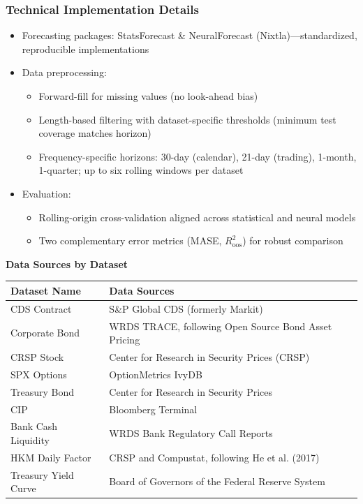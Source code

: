 \documentclass[ignorenonframetext, 9pt]{beamer}
\begin{document}
\begin{frame}
  \frametitle{Technical Implementation Details}
  \label{slide:technical}
\begin{itemize}
\item \alert{Forecasting packages:} StatsForecast \& NeuralForecast (Nixtla)---standardized, reproducible implementations
\vspace{0.3cm}
\item \alert{Data preprocessing:}
\begin{itemize}
  \item Forward-fill for missing values (no look-ahead bias)
  \item Length-based filtering with dataset-specific thresholds (minimum test coverage matches horizon)
  \item Frequency-specific horizons: 30-day (calendar), 21-day (trading), 1-month, 1-quarter; up to six rolling windows per dataset
\end{itemize}
\vspace{0.3cm}
\item \alert{Evaluation:}
\begin{itemize}
  \item Rolling-origin cross-validation aligned across statistical and neural models
  \item Two complementary error metrics (MASE, $R^2_{\text{oos}}$) for robust comparison
\end{itemize}
\end{itemize}
\end{frame}

\begin{frame}[plain]
  \tiny
  \vspace{-0.5cm}
  \centering
  \textbf{Data Sources by Dataset}\\
  \vspace{0.3cm}
  \begin{table}
  \centering
  \begin{tabular}{p{3cm}p{7cm}}
  \toprule
  Dataset Name & Data Sources \\
  \midrule
  CDS Contract & S\&P Global CDS (formerly Markit) \\
  Corporate Bond & WRDS TRACE, following Open Source Bond Asset Pricing \\
  CRSP Stock & Center for Research in Security Prices (CRSP) \\
  SPX Options & OptionMetrics IvyDB \\
  Treasury Bond & Center for Research in Security Prices \\
  CIP & Bloomberg Terminal \\
  Bank Cash Liquidity & WRDS Bank Regulatory Call Reports \\
  HKM Daily Factor & CRSP and Compustat, following He et al. (2017) \\
  Treasury Yield Curve & Board of Governors of the Federal Reserve System \\
  \bottomrule
  \end{tabular}
  \end{table}
\end{frame}


\end{document}
